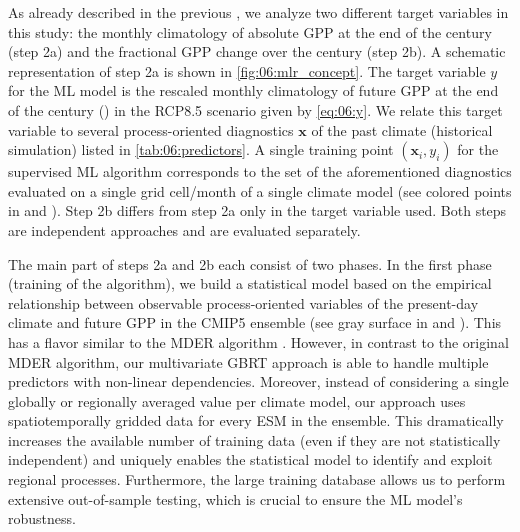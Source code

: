 As already described in the previous , we analyze
two different target variables in this study: the monthly climatology of
absolute \ac{GPP} at the end of the  century (step 2a) and the
fractional \ac{GPP} change over the  century (step 2b). A schematic
representation of step 2a is shown in \cref{fig:06:mlr_concept}. The target
variable $y$ for the \ac{ML} model is the rescaled monthly climatology of
future GPP at the end of the  century () in the
\acs{RCP}8.5 scenario given by \cref{eq:06:y}. We relate this target variable
to several process-oriented diagnostics $\bm{x}$ of the past climate
(historical simulation) listed in \cref{tab:06:predictors}. A single training
point $\left( \bm{x}_i, y_i \right)$ for the supervised \ac{ML} algorithm
corresponds to the set of the aforementioned diagnostics evaluated on a single
grid cell/month of a single climate model (see colored points in
  and ). Step 2b differs
from step 2a only in the target variable used. Both steps are independent
approaches and are evaluated separately.

The main part of steps 2a and 2b each consist of two phases. In the first phase
(training of the algorithm), we build a statistical model based on the
empirical relationship between observable process-oriented variables of the
present-day climate and future \ac{GPP} in the \acs{CMIP}5 ensemble (see gray
surface in 
 and
). This has a flavor similar
to the \ac{MDER} algorithm . However, in contrast to the original
\ac{MDER} algorithm, our multivariate \ac{GBRT} approach is able to handle
multiple predictors with non-linear dependencies. Moreover, instead of
considering a single globally or regionally averaged value per climate model,
our approach uses spatiotemporally gridded data for every \ac{ESM} in the
ensemble. This dramatically increases the available number of training data
(even if they are not statistically independent) and uniquely enables the
statistical model to identify and exploit regional processes. Furthermore, the
large training database allows us to perform extensive out-of-sample testing,
which is crucial to ensure the \ac{ML} model's robustness.


